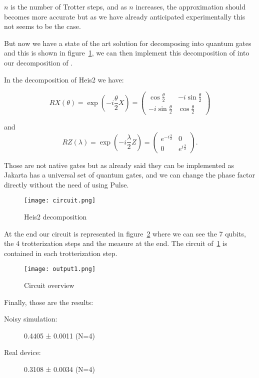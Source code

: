 $n$ is the number of Trotter steps, and as $n$ increases, the approximation should becomes more accurate but as we have already anticipated experimentally this not seems to be the case.

But now we have a state of the art solution for decomposing  into quantum gates~\cite{s1} \cite{s2} and this is shown in figure~\ref{fig:solution}, we can then implement this decomposition of  into our decomposition of .

In the decomposition of Heis2 we have:

\begin{equation}
    R X(\theta)=\exp \left(-i \frac{\theta}{2} X\right)=\left(\begin{array}{cc}
        \cos \frac{\theta}{2} & -i \sin \frac{\theta}{2} \\
        -i \sin \frac{\theta}{2} & \cos \frac{\theta}{2}
        \end{array}\right)
\end{equation}

and 
\begin{equation}
    R Z(\lambda)=\exp \left(-i \frac{\lambda}{2} Z\right)=\left(\begin{array}{cc}
        e^{-i \frac{\lambda}{2}} & 0 \\
        0 & e^{i \frac{\lambda}{2}}
        \end{array}\right).
\end{equation}

Those are not native gates but as already said they can be implemented as Jakarta has a universal set of quantum gates, and we can change the phase factor directly without the need of using Pulse.
\begin{figure}[htb]
    \texttt{[image: circuit.png]}
    \centering
    \caption{Heis2 decomposition}
    \label{fig:solution}
\end{figure}


At the end our circuit is represented in figure~\ref{fig:circuit} where we can see the 7 qubits, the 4 trotterization steps and the measure at the end. The circuit of~\ref{fig:solution} is contained in each trotterization step. 
\begin{figure}[htb]
    \texttt{[image: output1.png]}
    \centering
    \caption{Circuit overview}
    \label{fig:circuit}
\end{figure}

Finally, those are the results:
\begin{description}
    \item[Noisy simulation: ]0.4405 ± 0.0011 (N=4)
    \item[Real device: ]0.3108 ± 0.0034 (N=4)
    \end{description}

